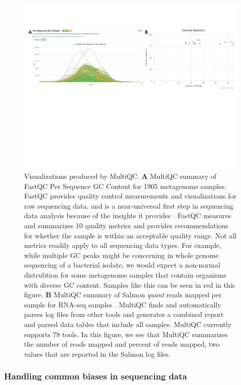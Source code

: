\documentclass[10pt,letterpaper]{article}
\begin{document}
\begin{figure}
\includegraphics[width=.9\textwidth]{figures/multiqc.pdf}
\caption{Visualizations produced by MultiQC. \textbf{A} MultiQC summary of FastQC Per Sequence GC Content for 1905 metagenome samples. FastQC provides quality control measurements and visualizations for raw sequencing data, and is a near-universal first step in sequencing data analysis because of the insights it provides \cite{andrews2010fastqc}. FastQC measures and summarizes 10 quality metrics and provides recommendations for whether the sample is within an acceptable quality range. Not all metrics readily apply to all sequencing data types. For example, while multiple GC peaks might be concerning in whole genome sequencing of a bacterial isolate, we would expect a non-normal distrubtion for some metagenome samples that contain organisms with diverse GC content. Samples like this can be seen in red in this figure. \textbf{B} MultiQC summary of Salmon \textit{quant} reads mapped per sample for RNA-seq samples \cite{patro2017salmon}. MultiQC finds and automatically parses log files from other tools and generates a combined report and parsed data tables that include all samples. MultiQC currently supports 78 tools. In this figure, we see that MultiQC summarizes the number of reads mapped and percent of reads mapped, two values that are reported in the Salmon log files.} 
\label{fig:multiqc}
\end{figure}


\subsubsection*{Handling common biases in sequencing data} %
\end{document}
